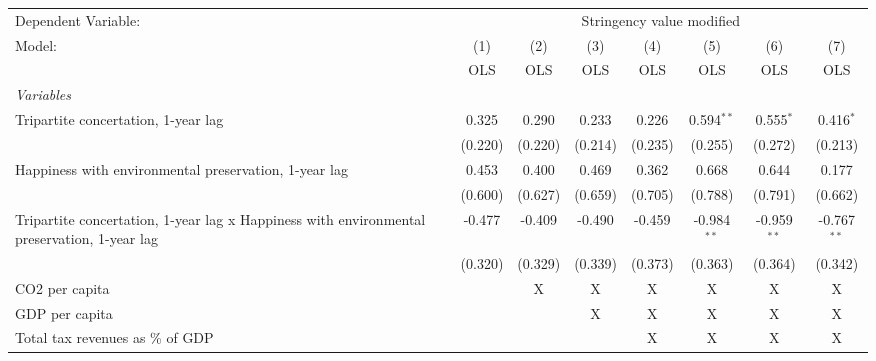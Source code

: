 
\begingroup
\centering
\begin{tabular}{lccccccc}
   \toprule
   Dependent Variable: & \multicolumn{7}{c}{Stringency value modified}\\
   Model:                                                                                      & (1)     & (2)     & (3)     & (4)     & (5)           & (6)           & (7)\\  
                                                                                               &  OLS    & OLS     & OLS     & OLS     & OLS           & OLS           & OLS\\  
   \midrule
   \emph{Variables}\\
   Tripartite concertation, 1-year lag                                                         & 0.325   & 0.290   & 0.233   & 0.226   & 0.594$^{**}$  & 0.555$^{*}$   & 0.416$^{*}$\\   
                                                                                               & (0.220) & (0.220) & (0.214) & (0.235) & (0.255)       & (0.272)       & (0.213)\\   
   Happiness with environmental preservation, 1-year lag                                       & 0.453   & 0.400   & 0.469   & 0.362   & 0.668         & 0.644         & 0.177\\   
                                                                                               & (0.600) & (0.627) & (0.659) & (0.705) & (0.788)       & (0.791)       & (0.662)\\   
   Tripartite concertation, 1-year lag x Happiness with environmental preservation, 1-year lag & -0.477  & -0.409  & -0.490  & -0.459  & -0.984$^{**}$ & -0.959$^{**}$ & -0.767$^{**}$\\   
                                                                                               & (0.320) & (0.329) & (0.339) & (0.373) & (0.363)       & (0.364)       & (0.342)\\   
   CO2 per capita                                                                              &         & X       & X       & X       & X             & X             & X\\  
   GDP per capita                                                                              &         &         & X       & X       & X             & X             & X\\  
   Total tax revenues as \% of GDP                                                             &         &         &         & X       & X             & X             & X\\  

\end{tabular}
